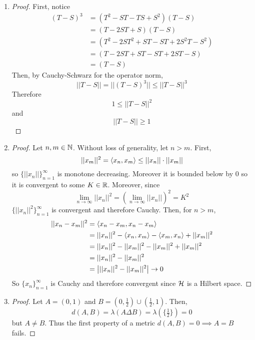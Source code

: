 \begin{enumerate}
\item \begin{proof}
	First, notice
		\begin{align*}
			(T-S)^3 &= (T^2-ST-TS+S^2)(T-S)\\
				&= (T-2ST+S)(T-S) \\
				&= (T^2-2ST^2+ST-ST+2S^2T-S^2) \\
				&= (T-2ST+ST-ST+2ST-S) \\
				&= (T-S)
		\end{align*}
	Then, by Cauchy-Schwarz for the operator norm,
		\[ ||T-S|| = ||(T-S)^3|| \le ||T-S||^3 \]
	Therefore
		\[ 1 \le ||T-S||^2\]
	and
		\[ ||T-S|| \ge 1 \]
\end{proof}

\item \begin{proof}
	Let $n,m \in \mathbb{N}$. Without loss of generality, let $n>m$. First,
		\[ ||x_m||^2 = \langle x_n,x_m \rangle \le ||x_n|| \cdot ||x_m|| \]
	so $\{||x_n||\}_{n=1}^\infty$ is monotone decreasing. Moreover it is bounded below by 0 so it is convergent to some $K \in \mathbb{R}$. Moreover, since
		\[ \lim_{n\to \infty} ||x_n||^2 = \left( \lim_{n \to \infty} ||x_n|| \right)^2 = K^2 \]
	$\{||x_n||^2\}_{n=1}^\infty$ is convergent and therefore Cauchy.
	Then, for $n>m$,
		\begin{align*}
			||x_n-x_m||^2 &= \langle x_n-x_m,x_n-x_m \rangle \\
				&=||x_n||^2 - \langle x_n,x_m \rangle - \langle x_m,x_n \rangle + ||x_m||^2 \\
				&=||x_n||^2 - ||x_m||^2 - ||x_m||^2 + ||x_m||^2 \\
				&=||x_n||^2-||x_m||^2 \\
				&=\left| ||x_n||^2-||x_m||^2 \right| \to 0\\
		\end{align*}
	So $\{x_n\}_{n=1}^\infty$ is Cauchy and therefore convergent since $\mathcal{H}$ is a Hilbert space.
\end{proof}

\item \begin{proof}
	Let $A=(0,1)$ and $B=(0,\tfrac 12) \cup (\tfrac 12,1)$. Then,
		\[ d(A,B) = \lambda(A \Delta B) = \lambda( \{ \tfrac 12 \} ) = 0 \]
	but $A \ne B$. Thus the first property of a metric $d(A,B)=0 \implies A=B$ fails.
\end{proof}


\end{enumerate}
